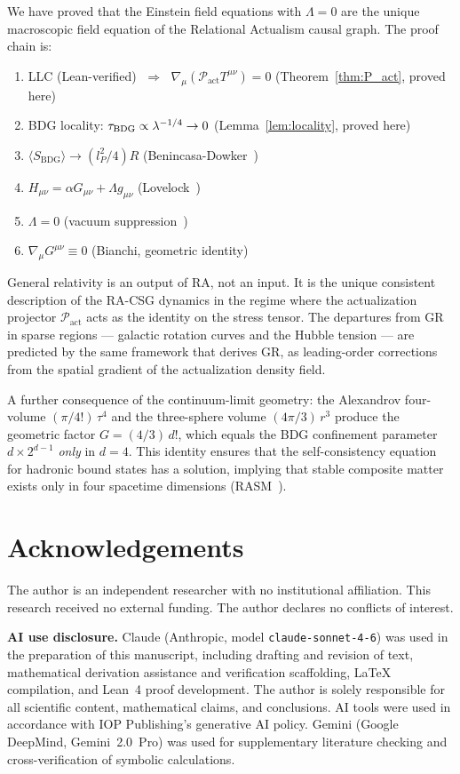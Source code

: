 \documentclass[11pt,a4paper]{article}
\newcommand{\Pact}{\mathcal{P}_{\mathrm{act}}}
\newcommand{\SBDG}{S_{\mathrm{BDG}}}
\begin{document}
We have proved that the Einstein field equations with $\Lambda = 0$
are the unique macroscopic field equation of the Relational Actualism
causal graph. The proof chain is:
\begin{enumerate}[noitemsep]
  \item LLC (Lean-verified) $\;\Rightarrow\;$
        $\nabla_\mu(\Pact T^{\mu\nu}) = 0$
        (Theorem~\ref{thm:P_act}, proved here)
  \item BDG locality: $\tau_{\rm BDG} \propto \lambda^{-1/4} \to 0$
        (Lemma~\ref{lem:locality}, proved here)
  \item $\langle\SBDG\rangle \to (l_P^2/4)R$
        (Benincasa-Dowker~\citep{Benincasa2010})
  \item $H_{\mu\nu} = \alpha G_{\mu\nu} + \Lambda g_{\mu\nu}$
        (Lovelock~\citep{Lovelock1971})
  \item $\Lambda = 0$ (vacuum suppression~\citep{Sandeman2026RAGC})
  \item $\nabla_\mu G^{\mu\nu} \equiv 0$ (Bianchi, geometric identity)
\end{enumerate}
General relativity is an output of RA, not an input. It is the unique
consistent description of the RA-CSG dynamics in the regime where the
actualization projector $\Pact$ acts as the identity on the stress
tensor. The departures from GR in sparse regions --- galactic rotation
curves and the Hubble tension --- are predicted by the same framework
that derives GR, as leading-order corrections from the spatial
gradient of the actualization density field.

A further consequence of the continuum-limit geometry: the Alexandrov
four-volume $(\pi/4!)\,\tau^4$ and the three-sphere volume $(4\pi/3)\,r^3$
produce the geometric factor $G = (4/3)\,d!$, which equals the BDG
confinement parameter $d \times 2^{d-1}$ \emph{only} in $d = 4$.
This identity ensures that the self-consistency equation for hadronic
bound states has a solution, implying that stable composite matter
exists only in four spacetime dimensions
(RASM~\citep{Sandeman2026RASM}).

\section*{Acknowledgements}

The author is an independent researcher with no institutional affiliation.
This research received no external funding.
The author declares no conflicts of interest.

\smallskip\noindent
\textbf{AI use disclosure.}
Claude (Anthropic, model \texttt{claude-sonnet-4-6}) was used in the
preparation of this manuscript, including drafting and revision of text,
mathematical derivation assistance and verification scaffolding,
\LaTeX{} compilation, and Lean~4 proof development.
The author is solely responsible for all scientific content,
mathematical claims, and conclusions.
AI tools were used in accordance with IOP Publishing's generative AI policy.
Gemini (Google DeepMind, Gemini~2.0~Pro) was used for supplementary
literature checking and cross-verification of symbolic calculations.
\end{document}
